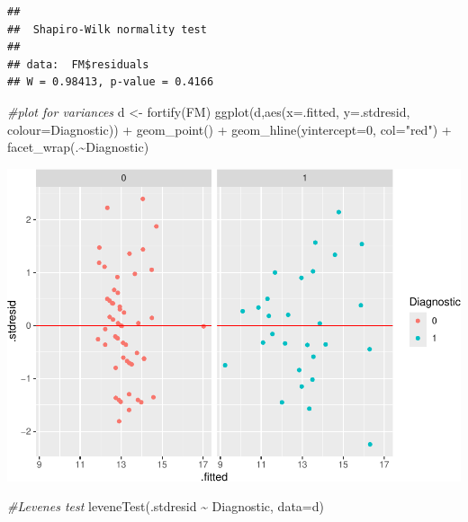 \documentclass[
]{article}
\newenvironment{Shaded}{\begin{snugshade}}{\end{snugshade}}
\newcommand{\AttributeTok}[1]{\textcolor[rgb]{0.77,0.63,0.00}{#1}}
\newcommand{\CommentTok}[1]{\textcolor[rgb]{0.56,0.35,0.01}{\textit{#1}}}
\newcommand{\DecValTok}[1]{\textcolor[rgb]{0.00,0.00,0.81}{#1}}
\newcommand{\FunctionTok}[1]{\textcolor[rgb]{0.00,0.00,0.00}{#1}}
\newcommand{\NormalTok}[1]{#1}
\newcommand{\OtherTok}[1]{\textcolor[rgb]{0.56,0.35,0.01}{#1}}
\newcommand{\SpecialCharTok}[1]{\textcolor[rgb]{0.00,0.00,0.00}{#1}}
\newcommand{\StringTok}[1]{\textcolor[rgb]{0.31,0.60,0.02}{#1}}
\begin{document}
\begin{Shaded}
\end{Shaded}

\begin{verbatim}
## 
##  Shapiro-Wilk normality test
## 
## data:  FM$residuals
## W = 0.98413, p-value = 0.4166
\end{verbatim}

\begin{Shaded}
\begin{Highlighting}[]
\CommentTok{\#plot for variances}
\NormalTok{d }\OtherTok{\textless{}{-}} \FunctionTok{fortify}\NormalTok{(FM)}
\FunctionTok{ggplot}\NormalTok{(d,}\FunctionTok{aes}\NormalTok{(}\AttributeTok{x=}\NormalTok{.fitted, }\AttributeTok{y=}\NormalTok{.stdresid, }\AttributeTok{colour=}\NormalTok{Diagnostic)) }\SpecialCharTok{+} 
  \FunctionTok{geom\_point}\NormalTok{() }\SpecialCharTok{+} 
  \FunctionTok{geom\_hline}\NormalTok{(}\AttributeTok{yintercept=}\DecValTok{0}\NormalTok{, }\AttributeTok{col=}\StringTok{"red"}\NormalTok{) }\SpecialCharTok{+}
  \FunctionTok{facet\_wrap}\NormalTok{(.}\SpecialCharTok{\textasciitilde{}}\NormalTok{Diagnostic)}
\end{Highlighting}
\end{Shaded}

\includegraphics{WorkingExample1_code_files/figure-latex/unnamed-chunk-9-1.pdf}

\begin{Shaded}
\begin{Highlighting}[]
\CommentTok{\#Levene\textquotesingle{}s test}
\FunctionTok{leveneTest}\NormalTok{(.stdresid }\SpecialCharTok{\textasciitilde{}}\NormalTok{ Diagnostic, }\AttributeTok{data=}\NormalTok{d)}
\end{Highlighting}
\end{Shaded}
\end{document}
